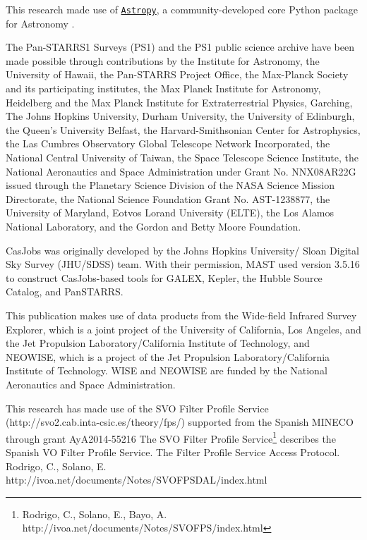 \documentclass[usenatbib]{mnras}
\begin{document}
This research made use of \href{http://www.astropy.org}{\tt Astropy}, 
a community-developed core Python package for Astronomy 
\citep{AstropyCollaboration2013, AstropyCollaboration2018}. 

The Pan-STARRS1 Surveys (PS1) and the PS1 public science archive have
been made possible through contributions by the Institute for
Astronomy, the University of Hawaii, the Pan-STARRS Project Office,
the Max-Planck Society and its participating institutes, the Max
Planck Institute for Astronomy, Heidelberg and the Max Planck
Institute for Extraterrestrial Physics, Garching, The Johns Hopkins
University, Durham University, the University of Edinburgh, the
Queen's University Belfast, the Harvard-Smithsonian Center for
Astrophysics, the Las Cumbres Observatory Global Telescope Network
Incorporated, the National Central University of Taiwan, the Space
Telescope Science Institute, the National Aeronautics and Space
Administration under Grant No. NNX08AR22G issued through the Planetary
Science Division of the NASA Science Mission Directorate, the National
Science Foundation Grant No. AST-1238877, the University of Maryland,
Eotvos Lorand University (ELTE), the Los Alamos National Laboratory,
and the Gordon and Betty Moore Foundation.

CasJobs was originally developed by the Johns Hopkins University/
Sloan Digital Sky Survey (JHU/SDSS) team. With their permission, MAST
used version 3.5.16 to construct CasJobs-based tools for GALEX,
Kepler, the Hubble Source Catalog, and PanSTARRS.

This publication makes use of data products from the Wide-field
Infrared Survey Explorer, which is a joint project of the University
of California, Los Angeles, and the Jet Propulsion
Laboratory/California Institute of Technology, and NEOWISE, which is a
project of the Jet Propulsion Laboratory/California Institute of
Technology. WISE and NEOWISE are funded by the National Aeronautics
and Space Administration.

This research has made use of the SVO Filter Profile Service
(http://svo2.cab.inta-csic.es/theory/fps/) supported from the Spanish
MINECO through grant AyA2014-55216 
The SVO Filter Profile Service\footnote{Rodrigo, C., Solano, E., Bayo, A. http://ivoa.net/documents/Notes/SVOFPS/index.html}
describes the Spanish VO Filter Profile Service. 
The Filter Profile Service Access Protocol. Rodrigo, C., Solano, E. http://ivoa.net/documents/Notes/SVOFPSDAL/index.html

\newpage
\end{document}
